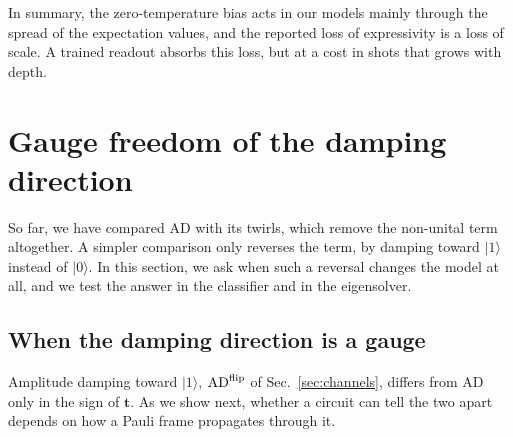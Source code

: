 \documentclass[
 aps,pra,
 twocolumn,
 superscriptaddress,
 longbibliography,
 nofootinbib
]{revtex4-2}
\providecommand{\ket}[1]{\lvert #1 \rangle}
\newcommand{\AD}{\mathrm{AD}}
\begin{document}
In summary, the zero-temperature bias acts in our models mainly through the spread of
the expectation values, and the reported loss of expressivity is a loss of
scale. A trained readout absorbs
this loss, but at a cost in shots that grows with depth.

\section{Gauge freedom of the damping direction}
\label{sec:gauge}

So far, we have compared AD with its twirls, which remove the non-unital term
altogether. A simpler comparison only reverses the term, by damping toward
$\ket1$ instead of $\ket0$. In this section, we ask when such a reversal
changes the model at all, and we test the answer in the classifier and in the
eigensolver.

\subsection{When the damping direction is a gauge}
\label{sec:gauge_def}

Amplitude damping toward $\ket{1}$, $\AD^{\rm flip}$ of
Sec.~\ref{sec:channels}, differs from $\AD$ only in the sign of $\mathbf t$. As we
show next, whether a circuit can tell the two apart depends on how a Pauli
frame propagates through it.
\end{document}
